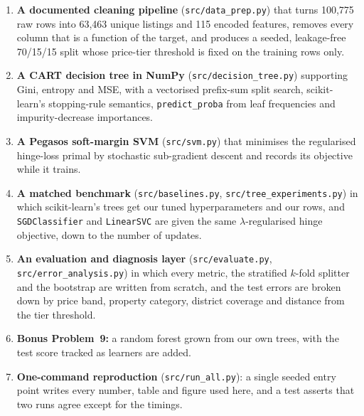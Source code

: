\documentclass[10pt,twocolumn,a4paper]{article}
\begin{document}
\begin{enumerate}
  \item \textbf{A documented cleaning pipeline} (\texttt{src/data\_prep.py})
    that turns 100{,}775 raw rows into 63{,}463 unique listings and 115
    encoded features, removes every column that is a function of the target,
    and produces a seeded, leakage-free 70/15/15 split whose price-tier
    threshold is fixed on the training rows only.
  \item \textbf{A CART decision tree in NumPy} (\texttt{src/decision\_tree.py})
    supporting Gini, entropy and MSE, with a vectorised prefix-sum split
    search, scikit-learn's stopping-rule semantics, \texttt{predict\_proba}
    from leaf frequencies and impurity-decrease importances.
  \item \textbf{A Pegasos soft-margin SVM} (\texttt{src/svm.py}) that
    minimises the regularised hinge-loss primal by stochastic sub-gradient
    descent and records its objective while it trains.
  \item \textbf{A matched benchmark} (\texttt{src/baselines.py},
    \texttt{src/tree\_experiments.py}) in which scikit-learn's trees get our
    tuned hyperparameters and our rows, and \texttt{SGDClassifier} and
    \texttt{LinearSVC} are given the same $\lambda$-regularised hinge
    objective, down to the number of updates.
  \item \textbf{An evaluation and diagnosis layer} (\texttt{src/evaluate.py},
    \texttt{src/error\_analysis.py}) in which every metric, the stratified
    $k$-fold splitter and the bootstrap are written from scratch, and the test
    errors are broken down by price band, property category, district coverage
    and distance from the tier threshold.
  \item \textbf{Bonus Problem~9:} a random forest grown from our own trees,
    with the test score tracked as learners are added.
  \item \textbf{One-command reproduction} (\texttt{src/run\_all.py}): a single
    seeded entry point writes every number, table and figure used here, and a
    test asserts that two runs agree except for the timings.
\end{enumerate}
\end{document}

